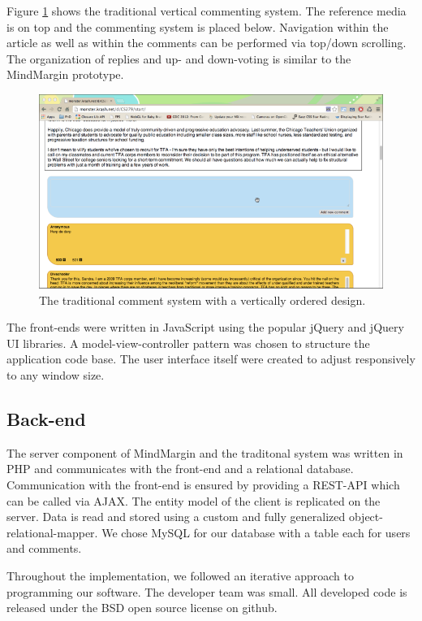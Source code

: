 Figure \ref{fig:traditional} shows the traditional vertical commenting system. The reference media is on top and the commenting system is placed below. Navigation within the article as well as within the comments can be performed via top/down scrolling. The organization of replies and up- and down-voting is similar to the MindMargin prototype.

\begin{figure}
\includegraphics[scale=0.3]{traditional.png} 
\caption{The traditional comment system with a vertically ordered design.}
\label{fig:traditional}
\end{figure}

The front-ends were written in JavaScript using the popular jQuery and jQuery UI libraries. A model-view-controller pattern was chosen to structure the application code base. The user interface itself were created to adjust responsively to any window size.

\subsection{Back-end}
The server component of MindMargin and the traditonal system was written in PHP and communicates with the front-end and a relational database. Communication with the front-end is ensured by providing a REST-API which can be called via AJAX. The entity model of the client is replicated on the server. Data is read and stored using a custom and fully generalized object-relational-mapper. We chose MySQL for our database with a table each for users and comments.

Throughout the implementation, we followed an iterative approach to programming our software. The developer team was small. All developed code is released under the BSD open source license on github.